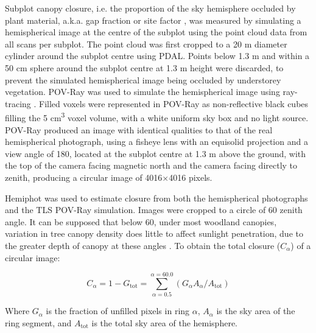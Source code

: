 \documentclass[11pt,a4paper]{article}
\begin{document}
Subplot canopy closure, i.e. the proportion of the sky hemisphere occluded by plant material, a.k.a. gap fraction or site factor \citep{Jennings1999}, was measured by simulating a hemispherical image at the centre of the subplot using the point cloud data from all scans per subplot. The point cloud was first cropped to a 20 m diameter cylinder around the subplot centre using PDAL. Points below 1.3 m and within a 50 cm sphere around the subplot centre at 1.3 m height were discarded, to prevent the simulated hemispherical image being occluded by understorey vegetation. POV-Ray was used to simulate the hemispherical image using ray-tracing \citep{Povray2004}. Filled voxels were represented in POV-Ray as non-reflective black cubes filling the 5 cm\textsuperscript{3} voxel volume, with a white uniform sky box and no light source. POV-Ray produced an image with identical qualities to that of the real hemispherical photograph, using a fisheye lens with an equisolid projection and a view angle of 180\textdegree, located at the subplot centre at 1.3 m above the ground, with the top of the camera facing magnetic north and the camera facing directly to zenith, producing a circular image of 4016$\times$4016 pixels.

Hemiphot \citep{HemiPhot} was used to estimate closure from both the hemispherical photographs and the TLS POV-Ray simulation. Images were cropped to a circle of 60\textdegree{} zenith angle. It can be supposed that below 60\textdegree{}, under most woodland canopies, variation in tree canopy density does little to affect sunlight penetration, due to the greater depth of canopy at these angles \citep{Jupp2008}. To obtain the total closure ($C_{\alpha{}}$) of a circular image:

\begin{equation}
	C_{\alpha{}} = 1 - G_{\text{tot}} = \sum_{\alpha{} = 0.5}^{\alpha{} = 60.0}(G_{\alpha{}} A_{\alpha{}} / A_{\text{tot}})
\end{equation}

Where $G_{\alpha{}}$ is the fraction of unfilled pixels in ring $\alpha{}$, $A_{\alpha{}}$ is the sky area of the ring segment, and $A_{\text{tot}}$ is the total sky area of the hemisphere.
\end{document}
